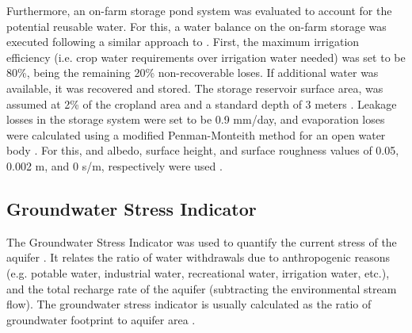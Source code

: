 Furthermore, an on-farm storage pond system was evaluated to account for the potential reusable water. For this, a water balance on the on-farm storage was executed following a similar approach to \citet{reinhartSimulatedWaterQuality2019}. First, the maximum irrigation efficiency (i.e. crop water requirements over irrigation water needed) was set to be 80\%, being the remaining 20\% non-recoverable loses. If additional water was available, it was recovered and stored. The storage reservoir surface area, was assumed at 2\% of the cropland area and a standard depth of 3 meters \cite{reinhartSimulatedWaterQuality2019}. Leakage losses in the storage system were set to be 0.9 mm/day, and evaporation loses were calculated using a modified Penman-Monteith method for an open water body \cite{reinhartSimulatedWaterQuality2019}. For this, and albedo, surface height, and surface roughness values of 0.05, 0.002 m, and 0 s/m, respectively were used \cite{princeczarneckijobym.QuantifyingCaptureUse2017}.

\subsection{Groundwater Stress Indicator}
The Groundwater Stress Indicator was used to quantify the current stress of the aquifer \cite{Aqueductglobalmaps2015}. It relates the ratio of water withdrawals due to anthropogenic reasons (e.g. potable water, industrial water, recreational water, irrigation water, etc.), and the total recharge rate of the aquifer (subtracting the environmental stream flow). The groundwater stress indicator is usually calculated as the ratio of groundwater footprint to aquifer area \cite{RegionalGroundwaterStress2013}.




